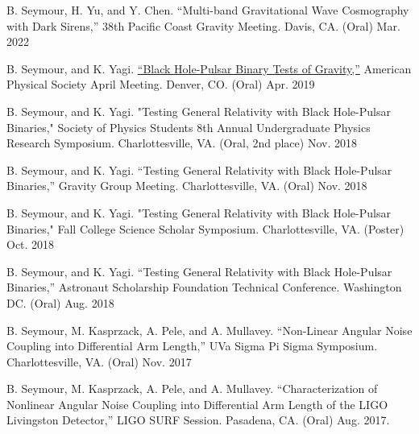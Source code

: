 \begin{cvpresentations}

    \cvpresentation
    {B. Seymour, H. Yu, and Y. Chen. “Multi-band Gravitational Wave Cosmography with Dark Sirens,” 38th Pacific Coast Gravity Meeting. Davis, CA. (Oral)}
    {Mar. 2022}


    \cvpresentation
    {B. Seymour, and K. Yagi. \href{https://meetings.aps.org/Meeting/APR19/Session/D16.7}{“Black Hole-Pulsar Binary Tests of Gravity,”} American Physical Society April Meeting. Denver, CO. (Oral)}
    {Apr. 2019}
    
  \cvpresentation
    {B. Seymour, and K. Yagi. "Testing General Relativity with Black Hole-Pulsar Binaries," Society of Physics Students 8th Annual Undergraduate Physics Research Symposium. Charlottesville, VA. (Oral, 2nd place)} %
    {Nov. 2018 } %
    
  \cvpresentation
    {B. Seymour, and K. Yagi. “Testing General Relativity with Black Hole-Pulsar Binaries,” Gravity Group Meeting. Charlottesville, VA. (Oral)} %
    {Nov. 2018} %
    

  \cvpresentation
    {B. Seymour, and K. Yagi. "Testing General Relativity with Black Hole-Pulsar Binaries," Fall College Science Scholar Symposium. Charlottesville, VA. (Poster)} %
    {Oct. 2018} %



  \cvpresentation
    {B. Seymour, and K. Yagi. “Testing General Relativity with Black Hole-Pulsar Binaries,” Astronaut Scholarship Foundation Technical Conference. Washington DC. (Oral)} %
    {Aug. 2018} %



  \cvpresentation
    {B. Seymour, M. Kasprzack, A. Pele, and A. Mullavey. “Non-Linear Angular Noise Coupling into Differential Arm Length,” UVa Sigma Pi Sigma Symposium. Charlottesville, VA. (Oral)} %
    {Nov. 2017} %



  \cvpresentation
    {B. Seymour, M. Kasprzack, A. Pele, and A. Mullavey. “Characterization of Nonlinear Angular Noise Coupling into Differential Arm Length of the LIGO Livingston Detector,” LIGO SURF Session. Pasadena, CA. (Oral)} %
    {Aug. 2017.} %



\end{cvpresentations}
